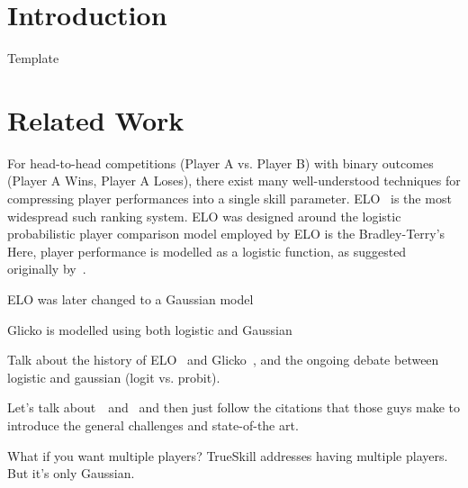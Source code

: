 \documentclass[10pt,twocolumn]{article}
\begin{document}


\section{Introduction}

  Template


\section{Related Work}

For head-to-head competitions (Player A vs. Player B) with binary outcomes (Player A Wins, Player A Loses), there exist many well-understood techniques for compressing player performances into a single skill parameter.
ELO~\cite{elo1978rating} is the most widespread such ranking system.
ELO was designed around the logistic probabilistic player comparison model employed by ELO is the Bradley-Terry's Here, player performance is modelled as a logistic function, as suggested originally by~\cite{bradley1952rank}.

ELO was later changed to a Gaussian model

Glicko is modelled using both logistic and Gaussian

Talk about the history of ELO~\cite{elo1978rating} and Glicko~\cite{glickman1999parameter}, and the ongoing debate between logistic and gaussian (logit vs. probit).

Let's talk about~\cite{herbrich2007trueskilltm}~and~\cite{coulom2008whole} and then just follow the citations that those guys make to introduce the general challenges and state-of-the art.


What if you want multiple players?
TrueSkill addresses having multiple players. But it's only Gaussian.
\end{document}
